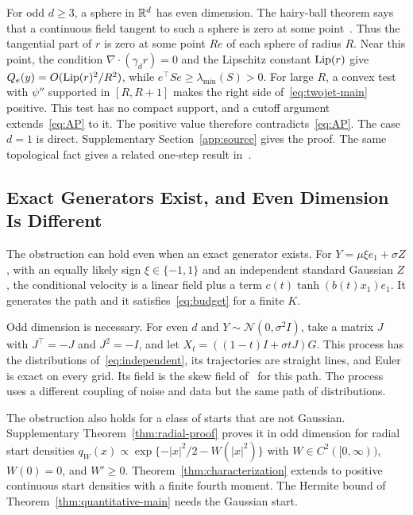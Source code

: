 For odd $d\ge3$, a sphere in $\mathbb R^d$ has even dimension. The hairy-ball
theorem says that a continuous field tangent to such a sphere is zero at
some point~\citep{hatcher2002algebraic}. Thus the tangential part of $r$
is zero at some point $Re$ of each sphere of radius $R$. Near this
point, the condition $\nabla\cdot(\gamma_dr)=0$ and the Lipschitz
constant ${\rm Lip}(r)$ give $Q_e(y)=O({\rm Lip}(r)^2/R^2)$, while
$e^\top Se\ge\lambda_{\min}(S)>0$. For large $R$, a convex test with
$\psi''$ supported in $[R,R+1]$ makes the right side
of~\eqref{eq:twojet-main} positive. This test has no compact support,
and a cutoff argument extends~\eqref{eq:AP} to it. The positive value
therefore contradicts~\eqref{eq:AP}.
The case $d=1$ is direct. Supplementary Section~\ref{app:source} gives
the proof. The same topological fact gives a related one-step result
in~\citep[Theorem~34]{obzherin2026finite}.

\subsection{Exact Generators Exist, and Even Dimension Is Different}
The obstruction can hold even when an exact generator exists. For
$Y=\mu\xi e_1+\sigma Z$, with an equally likely sign $\xi\in\{-1,1\}$ and an independent
standard Gaussian $Z$, the conditional velocity is a linear field plus a term
$c(t)\tanh(b(t)x_1)e_1$. It generates the path and it
satisfies~\eqref{eq:budget} for a finite $K$.

Odd dimension is necessary. For even $d$ and
$Y\sim\mathcal N(0,\sigma^2I)$, take a matrix $J$ with $J^\top=-J$ and
$J^2=-I$, and let $X_t=((1-t)I+\sigma tJ)G$. This process has the
distributions of~\eqref{eq:independent}, its trajectories are straight
lines, and Euler is exact on every grid. Its field is the skew field
of~\citep[Theorem~12]{obzherin2026density} for this path. The process
uses a different coupling of noise and data but the same path of
distributions.

The obstruction also holds for a class of starts that are not Gaussian.
Supplementary Theorem~\ref{thm:radial-proof} proves it in odd dimension for radial
start densities
$q_W(x)\propto\exp\{-|x|^2/2-W(|x|^2)\}$ with $W\in C^2([0,\infty))$, $W(0)=0$, and $W'\ge0$.
Theorem~\ref{thm:characterization} extends to positive continuous start
densities with a finite fourth moment. The Hermite bound of
Theorem~\ref{thm:quantitative-main} needs the Gaussian start.

